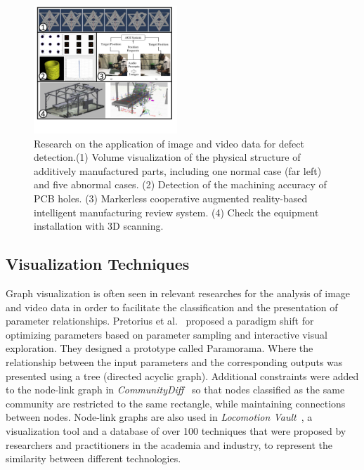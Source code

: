 \documentclass[a4paper,fleqn]{cas-dc}
\begin{document}
\begin{figure}[pos=h]
	\centering
	\includegraphics[width=0.48\textwidth]{Images/imageandvideo.pdf}
	\vspace{-4em}
	\caption{Research on the application of image and video data for defect detection.(1) Volume visualization of the physical structure of additively manufactured parts, including one normal case (far left) and five abnormal cases. (2) Detection of the machining accuracy of PCB holes. (3) Markerless cooperative augmented reality-based intelligent manufacturing review system. (4) Check the equipment installation with 3D scanning.}
	\label{fig:imageandvideo}
	\vspace{-1.5em}
\end{figure}

\subsection{Visualization Techniques}
Graph visualization is often seen in relevant researches for the analysis of image and video data in order to facilitate the classification and the presentation of parameter relationships.
Pretorius et al.~\cite{Pretorius2011} proposed a paradigm shift for optimizing parameters based on parameter sampling and interactive visual exploration. They designed a prototype called Paramorama. Where the relationship between the input parameters and the corresponding outputs was presented using a tree (directed acyclic graph).
Additional constraints were added to the node-link graph in \textit{CommunityDiff}~\cite{Emelyanova} so that nodes classified as the same community are restricted to the same rectangle, while maintaining connections between nodes.
Node-link graphs are also used in \textit{Locomotion Vault}~\cite{Luca2021}, a visualization tool and a database of over 100 techniques that were proposed by researchers and practitioners in the academia and industry, to represent the similarity between different technologies.
\end{document}
